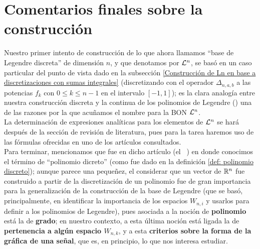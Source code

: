 \section{Comentarios finales sobre la construcción} 
\label{sec: commentarios finales}
Nuestro primer intento de 
construcción de lo que ahora llamamos 
``base de Legendre discreta'' de dimensión $n$,
y que denotamos por
$\mathcal{L}^{n}$, se basó en 
un caso particular del punto de vista
dado en la subsección 
\ref{Construcción de Ln en base a discretizaciones con sumas integrales}
(discretizando con el operador $\Delta_{n,a,b}$
a las potencias $f_{k}$
con $0 \leq k \leq n-1$
en el intervalo $[-1,1]$); es la clara analogía 
entre nuestra construcción discreta y la continua
de los polinomios de Legendre () una de las
razones por la que acuñamos el nombre para
la BON $\mathcal{L}^{n}$. \\ 

La determinación de expresiones analíticas para los
elementos de $\mathcal{L}^{n}$ se hará después de la sección
de revisión de literatura, pues para la tarea haremos uso de las 
fórmulas ofrecidas en uno de los artículos consultados. \\

Para terminar, mencionamos que fue en dicho artículo
(el ~\cite{Neuman})
en donde conocimos el término de ``polinomio dicreto''
(como fue dado en la definición \ref{def: polinomio discreto});
aunque parece una pequeñez, el considerar que
un vector de $\mathbb{R}^{n}$ fue construido a partir
de la discretización de un polinomio fue de gran importancia
para la generalización de la construcción de la base de Legendre
(que se basó, principalmente,
en identificar la importancia de
los espacios $W_{n,i}$ y usarlos para definir
a los polinomios de Legendre),
pues asociada a la noción de \textbf{polinomio} está la de \textbf{grado}; 
en nuestro
contexto, a esta última noción está ligada la de \textbf{pertenencia a
algún espacio $W_{n,k}$}, y a esta \textbf{criterios sobre la forma de la
gráfica de una señal}, que es, en principio, lo que nos interesa estudiar.